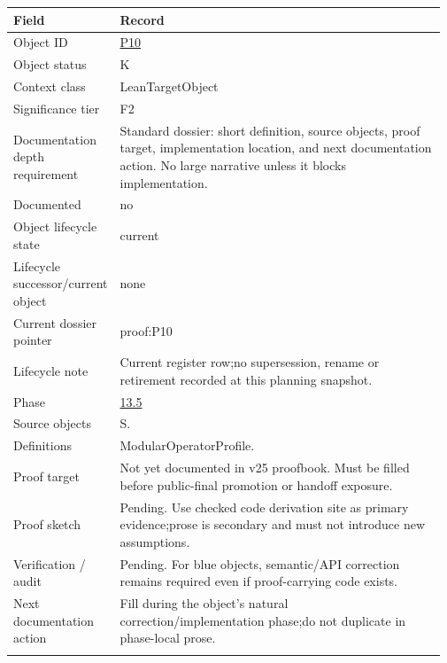 \begin{longtable}{L{0.16\linewidth} L{0.81\linewidth}}
\hline
\textbf{Field} & \textbf{Record}\\
\hline
Object ID & \hyperlink{object-row-P10}{P10}\\
\hline\addlinespace[0.20em]
Object status & K\\
\hline\addlinespace[0.20em]
Context class & LeanTargetObject\\
\hline\addlinespace[0.20em]
Significance tier & F2\\
\hline\addlinespace[0.20em]
Documentation depth requirement & Standard dossier: short definition, source objects, proof target, implementation location, and next documentation action. No large narrative unless it blocks implementation.\\
\hline\addlinespace[0.20em]
Documented & no\\
\hline\addlinespace[0.20em]
Object lifecycle state & current\\
\hline\addlinespace[0.20em]
Lifecycle successor/\allowbreak{}current object & none\\
\hline\addlinespace[0.20em]
Current dossier pointer & proof:P10\\
\hline\addlinespace[0.20em]
Lifecycle note & Current register row;\newline no supersession, rename or retirement recorded at this planning snapshot.\\
\hline\addlinespace[0.20em]
Phase & \hyperlink{phase-row-13-5}{13.5}\\
\hline\addlinespace[0.20em]
Source objects & S.\\
\hline\addlinespace[0.20em]
Definitions & ModularOperatorProfile.\\
\hline\addlinespace[0.20em]
Proof target & Not yet documented in v25 proofbook. Must be filled before public-final promotion or handoff exposure.\\
\hline\addlinespace[0.20em]
Proof sketch & Pending. Use checked code derivation site as primary evidence;\newline prose is secondary and must not introduce new assumptions.\\
\hline\addlinespace[0.20em]
Verification /\allowbreak{} audit & Pending. For blue objects, semantic/\allowbreak{}API correction remains required even if proof-carrying code exists.\\
\hline\addlinespace[0.20em]
Next documentation action & Fill during the object's natural correction/\allowbreak{}implementation phase;\newline do not duplicate in phase-local prose.\\
\hline\addlinespace[0.20em]
\end{longtable}
